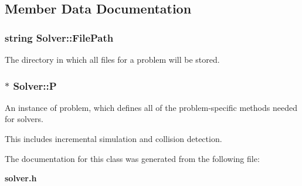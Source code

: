 \subsection{Member Data Documentation}
\subsubsection{\setlength{\rightskip}{0pt plus 5cm}string Solver::File\-Path}\label{class_Solver_m0}


The directory in which all files for a problem will be stored.

\subsubsection{ $\ast$ Solver::P}\label{class_Solver_m1}


An instance of problem, which defines all of the problem-specific methods needed for solvers.

This includes incremental simulation and collision detection. 

The documentation for this class was generated from the following file:\begin{CompactItemize}
\item 
{\bf solver.h}\end{CompactItemize}
